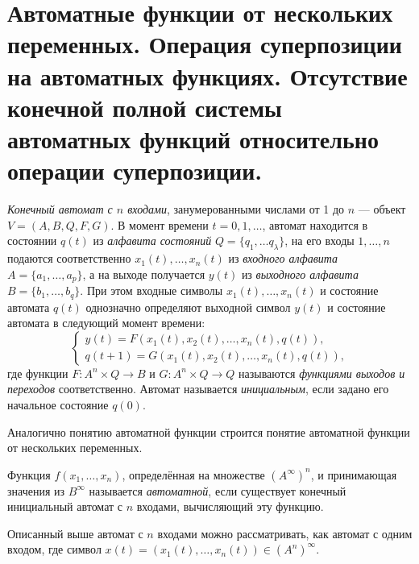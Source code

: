 \section{Автоматные функции от нескольких переменных. Операция суперпозиции на автоматных функциях. Отсутствие конечной полной системы автоматных функций относительно операции суперпозиции.}

\begin{definition}
    \textit{Конечный автомат с $n$ входами}, занумерованными числами от 1 до $n$ --- объект $V = (A, B, Q, F, G)$. В момент времени $t = 0,1,\ldots$, автомат находится в состоянии $q(t)$ из \textit{алфавита состояний} $Q=\{q_1, \ldots q_{\lambda}\}$, на его входы $1, \ldots, n$ подаются соответственно $x_1(t), \ldots, x_n(t)$ из \textit{входного алфавита} $A=\{a_1, \ldots, a_p\}$, а на выходе получается $y(t)$ из \textit{выходного алфавита} $B=\{b_1, \ldots, b_q\}$. При этом входные символы $x_1(t), \ldots, x_n(t)$ и состояние автомата $q(t)$ однозначно определяют выходной символ $y(t)$ и состояние автомата в следующий момент времени:
    \[
        \begin{cases}
            y(t) = F(x_1(t), x_2(t), \ldots, x_n(t), q(t)),\\
            q(t+1) = G(x_1(t), x_2(t), \ldots, x_n(t), q(t)),
        \end{cases}
    \]
    где функции $F:A^n\times Q \to B$ и $G:A^n\times Q \to Q$ называются \textit{функциями выходов и переходов} соответственно. Автомат называется \textit{инициальным}, если задано его начальное состояние $q(0)$.
\end{definition}

Аналогично понятию автоматной функции строится понятие автоматной функции от нескольких переменных.

\begin{definition}
    Функция $f(x_1, \ldots, x_n)$, определённая на множестве $(A^\infty)^n$, и принимающая значения из $B^\infty$ называется \textit{автоматной}, если существует конечный инициальный автомат с $n$ входами, вычисляющий эту функцию.
\end{definition}

\begin{remark}
    Описанный выше автомат с $n$ входами можно рассматривать, как автомат с одним входом, где символ $x(t)=(x_1(t), \ldots, x_n(t)) \in (A^n)^\infty$.
\end{remark}

